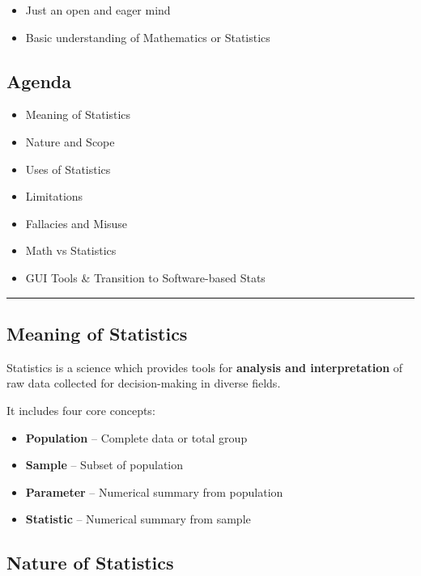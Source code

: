 \documentclass[
  letterpaper,
  DIV=11,
  numbers=noendperiod]{scrreprt}
\providecommand{\tightlist}{%
  \setlength{\itemsep}{0pt}\setlength{\parskip}{0pt}}
\begin{document}
\begin{itemize}
\tightlist
\item
  Just an open and eager mind
\item
  Basic understanding of Mathematics or Statistics
\end{itemize}

\subsection{Agenda}\label{agenda}

\begin{itemize}
\tightlist
\item
  Meaning of Statistics
\item
  Nature and Scope
\item
  Uses of Statistics
\item
  Limitations
\item
  Fallacies and Misuse
\item
  Math vs Statistics
\item
  GUI Tools \& Transition to Software-based Stats
\end{itemize}

\begin{center}\rule{0.5\linewidth}{0.5pt}\end{center}

\subsection{Meaning of Statistics}\label{meaning-of-statistics}

Statistics is a science which provides tools for \textbf{analysis and
interpretation} of raw data collected for decision-making in diverse
fields.

It includes four core concepts:

\begin{itemize}
\tightlist
\item
  \textbf{Population} -- Complete data or total group
\item
  \textbf{Sample} -- Subset of population
\item
  \textbf{Parameter} -- Numerical summary from population
\item
  \textbf{Statistic} -- Numerical summary from sample
\end{itemize}

\subsection{Nature of Statistics}\label{nature-of-statistics}
\end{document}
